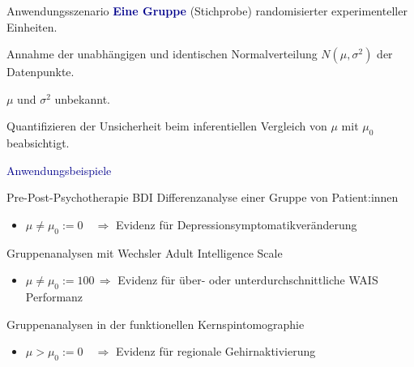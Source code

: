 \documentclass[
  8pt,
  ignorenonframetext,
]{beamer}
\providecommand{\tightlist}{%
  \setlength{\itemsep}{0pt}\setlength{\parskip}{0pt}}
\begin{document}
\begin{frame}{Anwendungsszenario}
\protect\hypertarget{anwendungsszenario}{}
\textbf{\textcolor{darkblue}{Eine Gruppe}} (Stichprobe) randomisierter
experimenteller Einheiten.

Annahme der unabhängigen und identischen Normalverteilung
\(N(\mu,\sigma^2)\) der Datenpunkte.

\(\mu\) und \(\sigma^2\) unbekannt.

Quantifizieren der Unsicherheit beim inferentiellen Vergleich von
\(\mu\) mit \(\mu_0\) beabsichtigt. \vspace{2mm}

\textcolor{darkblue}{Anwendungsbeispiele}

\small

Pre-Post-Psychotherapie BDI Differenzanalyse einer Gruppe von
Patient:innen

\vspace{-2mm}

\begin{itemize}
\tightlist
\item
  \(\mu \neq \mu_0 := 0 \quad \Rightarrow\) Evidenz für
  Depressionsymptomatikveränderung
\end{itemize}

Gruppenanalysen mit Wechsler Adult Intelligence Scale

\vspace{-2mm}

\begin{itemize}
\tightlist
\item
  \(\mu \neq \mu_0 := 100\, \Rightarrow\) Evidenz für über- oder
  unterdurchschnittliche WAIS Performanz
\end{itemize}

Gruppenanalysen in der funktionellen Kernspintomographie

\vspace{-2mm}

\begin{itemize}
\tightlist
\item
  \(\mu > \mu_0 := 0 \quad \Rightarrow\) Evidenz für regionale
  Gehirnaktivierung
\end{itemize}
\end{frame}
\end{document}
